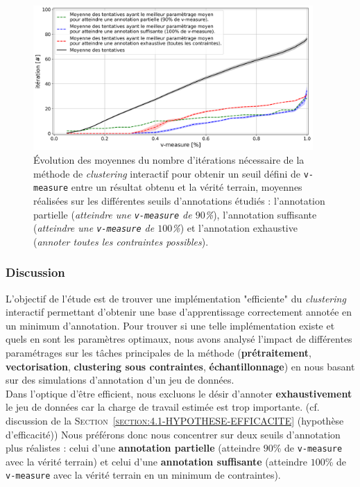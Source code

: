 			\begin{figure}[!htb]
				\centering
				\includegraphics[width=0.95\textwidth]{figures/etude-efficience-evolution-moyenne-5best-par-vmeasure}
				\caption{
					Évolution des moyennes du nombre d'itérations nécessaire de la méthode de \textit{clustering} interactif pour obtenir un seuil défini de \texttt{v-measure} entre un résultat obtenu et la vérité terrain, moyennes réalisées sur les différentes seuils d'annotations étudiés : l'annotation partielle (\textit{atteindre une \texttt{v-measure} de $90$\%}), l'annotation suffisante (\textit{atteindre une \texttt{v-measure} de $100$\%}) et l'annotation exhaustive (\textit{annoter toutes les contraintes possibles}).
				}
				\label{figure:4.2.1-ETUDE-OPTIMISATION-EVOLUTION-MEILLEUR-PARAMETRAGE}
			\end{figure}

		\subsubsection{Discussion}

			L'objectif de l'étude est de trouver une implémentation "efficiente" du \textit{clustering} interactif permettant d'obtenir une base d'apprentissage correctement annotée en un minimum d'annotation.
			Pour trouver si une telle implémentation existe et quels en sont les paramètres optimaux, nous avons analysé l'impact de différentes paramétrages sur les tâches principales de la méthode (\textbf{prétraitement}, \textbf{vectorisation}, \textbf{clustering sous contraintes}, \textbf{échantillonnage}) en nous basant sur des simulations d'annotation d'un jeu de données.
			\\
			
			Dans l'optique d'être efficient, nous excluons le désir d'annoter \textbf{exhaustivement} le jeu de données car la charge de travail estimée est trop importante.
			(cf. discussion de la \textsc{Section~\ref{section:4.1-HYPOTHESE-EFFICACITE}} (hypothèse d'efficacité))
			Nous préférons donc nous concentrer sur deux seuils d'annotation plus réalistes : celui d'une \textbf{annotation partielle} (atteindre $90$\% de \texttt{v-measure} avec la vérité terrain) et celui d'une \textbf{annotation suffisante} (atteindre $100$\% de \texttt{v-measure} avec la vérité terrain en un minimum de contraintes). 
			
